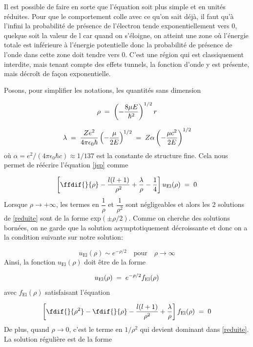 Il est possible de faire en sorte que l'équation soit plus simple et en unités réduites. Pour que le comportement colle avec ce qu'on sait déjà, il faut qu'à l'infini la probabilité de présence de l'électron tende exponentiellement vers 0, quelque soit la valeur de l car quand on s'éloigne, on atteint une zone où l'énergie totale est inférieure à l'énergie potentielle donc la probabilité de présence de l'onde dans cette zone doit tendre vers 0. C'est une région qui est classiquement interdite, mais tenant compte des effets tunnels, la fonction d'onde y est présente, mais décroît de façon exponentielle.


Posons, pour simplifier les notations, les quantités sans dimension 

\[
    \rho\; = \;\left(-\dfrac{8\mu E}{\hbar^2}\right)^{1/2}r
\]

\begin{equation}
    \lambda\; = \;\dfrac{Ze^2}{4\pi\epsilon_0 \hbar}\left(-\dfrac{\mu}{2E}\right)^{1/2}\; = \; Z\alpha\left(-\dfrac{\mu c^2}{2E}\right)^{1/2}
    \label{lambda}
\end{equation}
où $\alpha=e^2/(4\pi\epsilon_0 \hbar c) \approx 1/137$ est la constante de structure fine. Cela nous permet de réécrire l'équation \eqref{jsp} comme


\begin{equation}
    \left[\ffdif{}{\rho}-\dfrac{l(l+1)}{\rho^2}+\dfrac{\lambda}{\rho}-\dfrac{1}{4}\right]u_\text{El}(\rho)\eq0
    \label{reduite}
\end{equation}
Lorsque $\rho \rightarrow +\infty$, les termes en $\dfrac{1}{\rho}$ et $\dfrac{1}{\rho^2}$ sont négligeables et alors les 2 solutions de \eqref{reduite} sont de la forme exp$(\pm \rho/2)$. Comme on cherche des solutions bornées, on ne garde que la solution asymptotiquement décroissante et donc on a la condition suivante sur notre solution: 

\[
    u_\text{El}(\rho)\sim e^{-\rho/2} \quad \text{pour} \quad \rho \longrightarrow \infty
\]
Ainsi, la fonction $u_\text{El}(\rho)$ doit être de la forme 

\[
    u_\text{El}(\rho)\; = \; e^{-\rho/2}f_\text{El}(\rho)
\]
avec $f_\text{El}(\rho)$ satisfaisant l'équation

\begin{equation}
 \left[\fdif{}{\rho^2}-\fdif{}{\rho}-\dfrac{l(l+1)}{\rho^2}+\dfrac{\lambda}{\rho}\right]f_\text{El}(\rho)\eq0
 \label{fel}
\end{equation}
De plus, quand $\rho \longrightarrow 0$, c'est le terme en $1/\rho^2$ qui devient dominant dans \eqref{reduite}. La solution régulière est de la forme

